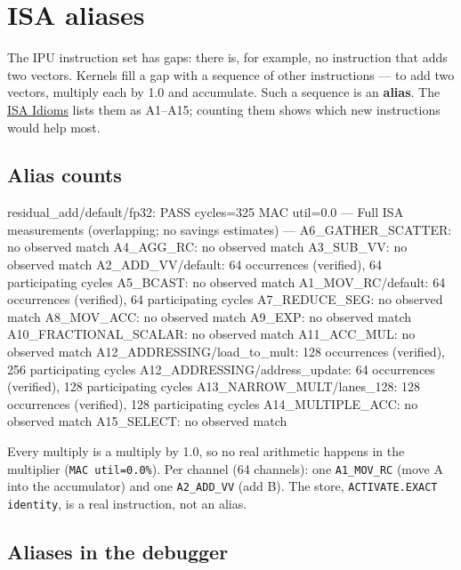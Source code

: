 \documentclass[11pt,a4paper]{article}
\newcommand{\doc}[2]{\href{https://rechefe.github.io/ipu-emulator/dev/#1/}{\textcolor{accent}{#2}}}
\begin{document}
\section{ISA aliases}

The IPU instruction set has gaps: there is, for example, no instruction that
adds two vectors. Kernels fill a gap with a sequence of other instructions ---
to add two vectors, multiply each by 1.0 and accumulate. Such a sequence is an
\textbf{alias}. The \doc{explanation/isa-idioms}{ISA Idioms} lists them as
A1--A15; counting them shows which new instructions would help most.

\subsection{Alias counts}

\begin{termout}
residual_add/default/fp32: PASS  cycles=325  MAC util=0.0%
--- Full ISA measurements (overlapping; no savings estimates) ---
A6_GATHER_SCATTER: no observed match
A4_AGG_RC: no observed match
A3_SUB_VV: no observed match
A2_ADD_VV/default: 64 occurrences (verified), 64 participating cycles
A5_BCAST: no observed match
A1_MOV_RC/default: 64 occurrences (verified), 64 participating cycles
A7_REDUCE_SEG: no observed match
A8_MOV_ACC: no observed match
A9_EXP: no observed match
A10_FRACTIONAL_SCALAR: no observed match
A11_ACC_MUL: no observed match
A12_ADDRESSING/load_to_mult: 128 occurrences (verified), 256 participating cycles
A12_ADDRESSING/address_update: 64 occurrences (verified), 128 participating cycles
A13_NARROW_MULT/lanes_128: 128 occurrences (verified), 128 participating cycles
A14_MULTIPLE_ACC: no observed match
A15_SELECT: no observed match
\end{termout}

Every multiply is a multiply by 1.0, so no real arithmetic happens in the
multiplier (\texttt{MAC util=0.0\%}). Per channel (64 channels): one
\texttt{A1\_MOV\_RC} (move A into the accumulator) and one
\texttt{A2\_ADD\_VV} (add B). The store, \texttt{ACTIVATE.EXACT identity},
is a real instruction, not an alias.

\subsection{Aliases in the debugger}
\end{document}
